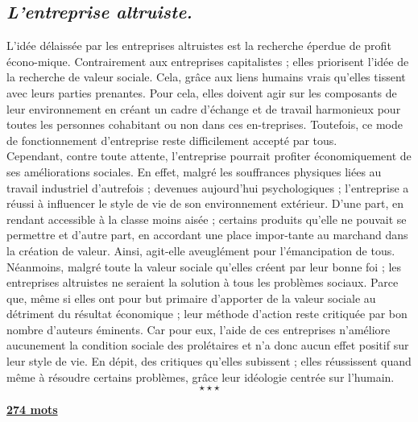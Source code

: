 \begin{center}
	\subsection*{\textit{L’entreprise altruiste.}}
\end{center}
\hspace*{0.5cm}L’idée délaissée par les entreprises altruistes est la recherche éperdue de profit écono-mique. Contrairement aux entreprises capitalistes ; elles priorisent l’idée de la recherche de valeur sociale. Cela, grâce aux liens humains vrais qu’elles tissent avec leurs parties prenantes. Pour cela, elles doivent agir sur les composants de leur environnement en créant un cadre d’échange et de travail harmonieux pour toutes les personnes cohabitant ou non dans ces en-treprises. Toutefois, ce mode de fonctionnement d’entreprise reste difficilement accepté par tous.\\
\hspace*{0.5cm}Cependant, contre toute attente, l’entreprise pourrait profiter économiquement de ses améliorations sociales. En effet, malgré les souffrances physiques liées au travail industriel d’autrefois ; devenues aujourd’hui psychologiques ; l’entreprise a réussi à influencer le style de vie de son environnement extérieur. D’une part, en rendant accessible à la classe moins aisée ; certains produits qu’elle ne pouvait se permettre et d’autre part, en accordant une place impor-tante au marchand dans la création de valeur. Ainsi, agit-elle aveuglément pour l’émancipation de tous.\\
\hspace*{0.5cm}Néanmoins, malgré toute la valeur sociale qu’elles créent par leur bonne foi ; les entreprises altruistes ne seraient la solution à tous les problèmes sociaux. Parce que, même si elles ont pour but primaire d’apporter de la valeur sociale au détriment du résultat économique ; leur méthode d’action reste critiquée par bon nombre d’auteurs éminents. Car pour eux, l’aide de ces entreprises n’améliore aucunement la condition sociale des prolétaires et n’a donc aucun effet positif sur leur style de vie. En dépit, des critiques qu’elles subissent ; elles réussissent quand même à résoudre certains problèmes, grâce leur idéologie centrée sur l’humain.
$$\star \star \star$$
\begin{center}
	\underline{\textbf{274 mots}}
\end{center}\newpage

